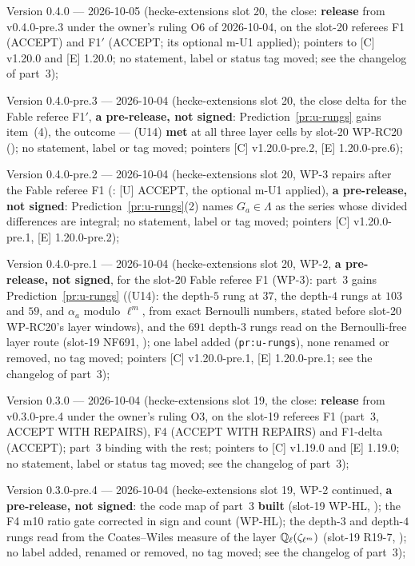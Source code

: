 \documentclass[11pt]{article}
\newcommand{\Iw}{\Lambda}                         %
\begin{document}
Version 0.4.0 --- 2026-10-05 (hecke-extensions slot 20, the close: \textbf{release} from v0.4.0-pre.3 under the owner's ruling O6 of 2026-10-04, on the
slot-20 referees F1 (ACCEPT) and F1$'$ (ACCEPT; its optional m-U1 applied); pointers to [C] v1.20.0 and [E] 1.20.0; no statement, label or status tag moved; see the changelog of part~3);

Version 0.4.0-pre.3 --- 2026-10-04 (hecke-extensions slot 20, the close delta for the Fable referee F1$'$, \textbf{a pre-release, not signed}: Prediction~\ref{pr:u-rungs} gains item~(4),
the outcome --- (U14) \textbf{met} at all three layer cells by slot-20 WP-RC20 (\COMP); no statement, label or tag moved; pointers [C] v1.20.0-pre.2, [E] 1.20.0-pre.6);

Version 0.4.0-pre.2 --- 2026-10-04 (hecke-extensions slot 20, WP-3 repairs after the Fable referee F1 (: [U] ACCEPT, the
optional m-U1 applied), \textbf{a pre-release, not signed}: Prediction~\ref{pr:u-rungs}(2) names $G_a\in\Iw$ as the series whose divided differences are integral; no statement, label or tag moved;
pointers [C] v1.20.0-pre.1, [E] 1.20.0-pre.2);

Version 0.4.0-pre.1 --- 2026-10-04 (hecke-extensions slot 20, WP-2, \textbf{a pre-release, not signed}, for the slot-20 Fable referee F1 (WP-3): part~3 gains
Prediction~\ref{pr:u-rungs} ((U14): the depth-$5$ rung at $37$, the depth-$4$ rungs at $103$ and $59$, and $\alpha_a$ modulo $\ell^{m}$, \PROVED{} from exact Bernoulli numbers, stated before
slot-20 WP-RC20's layer windows), and the $691$ depth-$3$ rungs read on the Bernoulli-free layer route (slot-19 NF691, \COMP); one label added (\texttt{pr:u-rungs}), none renamed or removed,
no tag moved; pointers [C] v1.20.0-pre.1, [E] 1.20.0-pre.1; see the changelog of part~3);

Version 0.3.0 --- 2026-10-04 (hecke-extensions slot 19, the close: \textbf{release} from v0.3.0-pre.4 under the owner's ruling O3, on the
slot-19 referees F1 (part~3, ACCEPT WITH REPAIRS), F4 (ACCEPT WITH REPAIRS) and F1-delta (ACCEPT); part~3 binding with the rest; pointers to [C] v1.19.0 and
[E] 1.19.0; no statement, label or status tag moved; see the changelog of part~3);

Version 0.3.0-pre.4 --- 2026-10-04 (hecke-extensions slot 19, WP-2 continued, \textbf{a pre-release, not signed}: the code map of part~3 \textbf{built} (slot-19
WP-HL, ); the F4 m10 ratio gate corrected in sign and count (WP-HL); the depth-$3$ and depth-$4$ rungs read from the Coates--Wiles measure
of the layer $\mathbb{Q}_\ell(\zeta_{\ell^{m}})$ (slot-19 R19-7, \COMP); no label added, renamed or removed, no tag moved; see the changelog of part~3);
\end{document}
